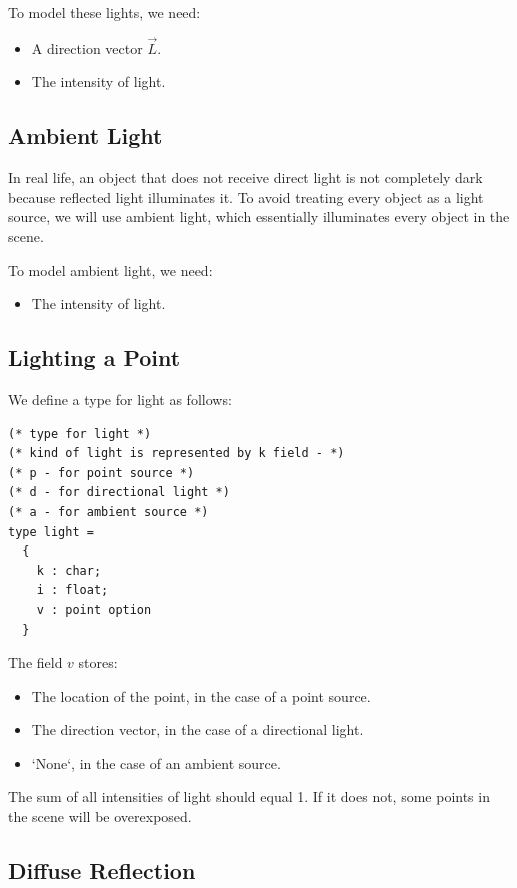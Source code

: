 \documentclass{article}
\begin{document}
To model these lights, we need:
\begin{itemize}
    \item A direction vector $\vec{L}$.
    \item The intensity of light.
\end{itemize}

\subsection{Ambient Light}

In real life, an object that does not receive direct light is not completely dark because reflected light illuminates it. To avoid treating every object as a light source, we will use ambient light, which essentially illuminates every object in the scene.

To model ambient light, we need:
\begin{itemize}
    \item The intensity of light.
\end{itemize}

\subsection{Lighting a Point}

We define a type for light as follows:

\begin{verbatim}
(* type for light *)
(* kind of light is represented by k field - *)
(* p - for point source *)
(* d - for directional light *)
(* a - for ambient source *)
type light = 
  {
    k : char;
    i : float;
    v : point option
  }
\end{verbatim}

The field $v$ stores:
\begin{itemize}
    \item The location of the point, in the case of a point source.
    \item The direction vector, in the case of a directional light.
    \item `None`, in the case of an ambient source.
\end{itemize}

The sum of all intensities of light should equal 1. If it does not, some points in the scene will be overexposed.

\subsection{Diffuse Reflection}
\end{document}
